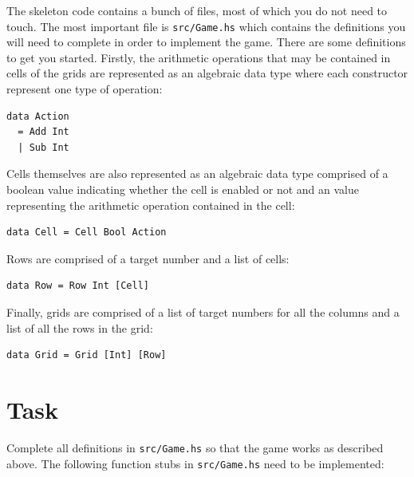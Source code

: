 The skeleton code contains a bunch of files, most of which you do not need to touch. The most important file is \texttt{\small src/Game.hs} which contains the definitions you will need to complete in order to implement the game. There are some definitions to get you started. Firstly, the arithmetic operations that may be contained in cells of the grids are represented as an algebraic data type where each constructor represent one type of operation:
\begin{verbatim}
data Action 
  = Add Int 
  | Sub Int 
\end{verbatim}
Cells themselves are also represented as an algebraic data type comprised of a boolean value indicating whether the cell is enabled or not and an  value representing the arithmetic operation contained in the cell:
\begin{verbatim}
data Cell = Cell Bool Action
\end{verbatim}
Rows are comprised of a target number and a list of cells:
\begin{verbatim}
data Row = Row Int [Cell]
\end{verbatim}
Finally, grids are comprised of a list of target numbers for all the columns and a list of all the rows in the grid:
\begin{verbatim}
data Grid = Grid [Int] [Row]
\end{verbatim}






\section{Task}

Complete all definitions in \texttt{\small src/Game.hs} so that the game works as described above. The following function stubs in \texttt{\small src/Game.hs} need to be implemented:

